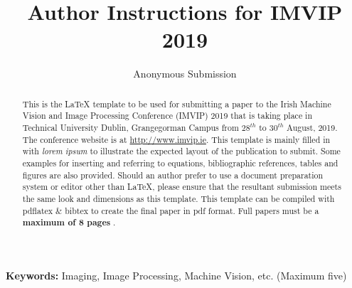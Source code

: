\documentclass[a4paper,11pt]{article}
\begin{document}
\title{Author Instructions for IMVIP 2019}

\author{Anonymous Submission}
\date{}
\maketitle
\thispagestyle{empty}



\begin{abstract}
This is the \LaTeX\xspace template to be used for submitting a paper
to the Irish Machine Vision and Image Processing Conference (IMVIP)
2019 that is taking place in Technical University Dublin, Grangegorman Campus from $28^{th}$ 
to $30^{th}$ August, 2019. The conference website is at
\url{http://www.imvip.ie}. This template is mainly filled in
with \textit{lorem ipsum} to illustrate the expected layout of the
publication to submit.  Some examples for inserting and referring to
equations, bibliographic references, tables and figures are also
provided. Should an author prefer to use a document preparation system
or editor other than \LaTeX\xspace, please ensure that the resultant
submission meets the same look and dimensions as this template.  This
template can be compiled with pdflatex \& bibtex to create the final
paper in pdf format. Full papers must be a \textbf{maximum of 8 pages
}.
\end{abstract}
\textbf{Keywords:} Imaging, Image Processing, Machine Vision, etc. (Maximum five)



\end{document}
